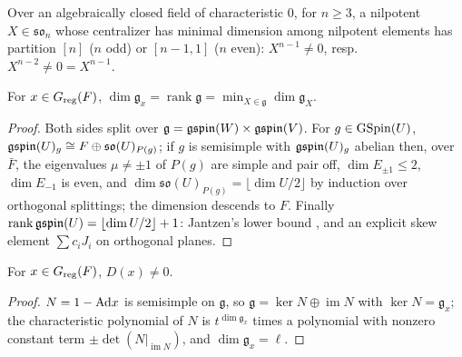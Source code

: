 \begin{literature}
\label{LIT-jantzen_regularNil_partition}
\leanok
Over an algebraically closed field of characteristic $0$, for $n\ge3$, a nilpotent $X\in\mathfrak{so}_n$ whose centralizer has
minimal dimension among nilpotent elements has partition $[n]$ ($n$ odd) or $[n-1,1]$ ($n$ even): $X^{n-1}\neq0$, resp.\
$X^{n-2}\neq0=X^{n-1}$.

\end{literature}

\begin{lemma}
\label{finrank_lieCentralizer_eq_lieRank}
\leanok
{}
For $x\in G_{\mathrm{reg}}(F)$, $\dim\mathfrak g_x=\operatorname{rank}\mathfrak g=\min_{X\in\mathfrak g}\dim\mathfrak g_X$.
\end{lemma}
\begin{proof}
\leanok
{}
Both sides split over $\mathfrak g=\mathfrak{gspin}(W)\times\mathfrak{gspin}(V)$. For $g\in\mathrm{GSpin}(U)$, $\mathfrak{gspin}(U)_g\cong F\oplus\mathfrak{so}(U)_{P(g)}$; if $g$ is semisimple with $\mathfrak{gspin}(U)_g$ abelian then, over $\bar F$, the eigenvalues $\mu\ne\pm1$ of $P(g)$ are simple and pair off, $\dim E_{\pm1}\le2$, $\dim E_{-1}$ is even, and $\dim\mathfrak{so}(U)_{P(g)}=\lfloor\dim U/2\rfloor$ by induction over orthogonal splittings; the dimension descends to $F$. Finally $\operatorname{rank}\mathfrak{gspin}(U)=\lfloor\dim U/2\rfloor+1$: Jantzen's lower bound \cite{Jantzen}, and an explicit skew element $\sum c_iJ_i$ on orthogonal planes.
\end{proof}

\begin{lemma}
\label{hcDisc_ne_zero_of_mem_regularSet}
\leanok
{}
For $x\in G_{\mathrm{reg}}(F)$, $D(x)\neq0$.
\end{lemma}
\begin{proof}
\leanok
{}
$N=1-\mathrm{Ad} x$ is semisimple on $\mathfrak g$, so $\mathfrak g=\ker N\oplus\operatorname{im}N$ with $\ker N=\mathfrak g_x$; the characteristic polynomial of $N$ is $t^{\dim\mathfrak g_x}$ times a polynomial with nonzero constant term $\pm\det(N|_{\operatorname{im}N})$, and $\dim\mathfrak g_x=\ell$.
\end{proof}

